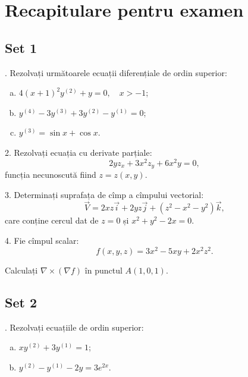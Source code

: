\chapter{Recapitulare pentru examen}

\section*{Set 1}

\indent{}. Rezolvați următoarele ecuații diferențiale de ordin superior:
\begin{enumerate}[(a)]
\item $ 4(x + 1)^2 y^{(2)} + y = 0, \quad x > -1 $;
\item $ y^{(4)} - 3y^{(3)} + 3y^{(2)} - y^{(1)} = 0 $;
\item $ y^{(3)} = \sin x + \cos x $.
\end{enumerate}

\vspace{1cm}

2. Rezolvați ecuația cu derivate parțiale:
\[
  2yz_x + 3x^2 z_y + 6x^2 y = 0,
\]
funcția necunoscută fiind $ z = z(x, y) $.

\vspace{1cm}

3. Determinați suprafața de cîmp a cîmpului vectorial:
\[
  \vec{V} = 2xz\vec{i} + 2yz\vec{j} + (z^2 - x^2 - y^2) \vec{k},
\]
care conține cercul dat de $ z = 0 $ și $ x^2 + y^2 - 2x = 0 $.

\vspace{1cm}

4. Fie cîmpul scalar:
\[
  f(x, y, z) = 3x^2 - 5xy + 2x^2z^2.
\]

Calculați $ \nabla \times (\nabla f) $ în punctul $ A(1, 0, 1) $.


\section*{Set 2}

\indent{}. Rezolvați ecuațiile de ordin superior:
\begin{enumerate}[(a)]
\item $ xy^{(2)} + 3y^{(1)} = 1 $;
\item $ y^{(2)} - y^{(1)} - 2y = 3e^{2x} $.
\end{enumerate}

\vspace{1cm}

